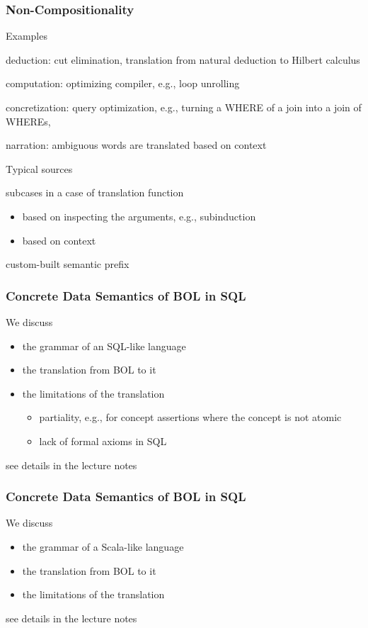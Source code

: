 \begin{frame}\frametitle{Non-Compositionality}
\begin{blockitems}{Examples}
 \item deduction: cut elimination, translation from natural deduction to Hilbert calculus
 \item computation: optimizing compiler, e.g., loop unrolling
 \item concretization: query optimization, e.g., turning a WHERE of a join into a join of WHEREs,
 \item narration: ambiguous words are translated based on context
\end{blockitems}

\begin{blockitems}{Typical sources}
 \item subcases in a case of translation function
  \begin{itemize}
  \item based on inspecting the arguments, e.g., subinduction
  \item based on context
  \end{itemize}
 \item custom-built semantic prefix
\end{blockitems}
\end{frame}

\begin{frame}\frametitle{Concrete Data Semantics of BOL in SQL}
We discuss
\begin{itemize}
\item the grammar of an SQL-like language
\item the translation from BOL to it
\item the limitations of the translation
 \begin{itemize}
 \item partiality, e.g., for concept assertions where the concept is not atomic
 \item lack of formal axioms in SQL
 \end{itemize}
\end{itemize}
see details in the lecture notes
\end{frame}

\begin{frame}\frametitle{Concrete Data Semantics of BOL in SQL}
We discuss
\begin{itemize}
\item the grammar of a Scala-like language
\item the translation from BOL to it
\item the limitations of the translation
\end{itemize}
see details in the lecture notes
\end{frame}


